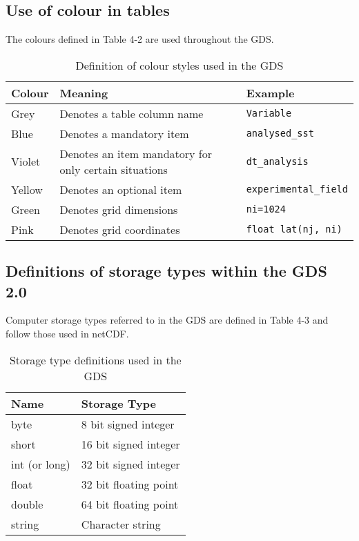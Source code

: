 \subsection{Use of colour in tables}
The colours defined in Table 4-2 are used throughout the GDS.
\begin{table}[h]
    \centering
    \caption{Definition of colour styles used in the GDS}
    \label{tab:color-styles}
    \begin{tabular}{|l|l|l|}
        \hline
        \rowcolor{lightgray} \textbf{Colour} & \textbf{Meaning} & \textbf{Example}\\
        \hline
        Grey & Denotes a table column name & \cellcolor{lightgray} \texttt{Variable}\\
        \hline
        Blue & Denotes a mandatory item & \cellcolor{cyan} \texttt{analysed\_sst}\\
        \hline
        Violet & Denotes an item mandatory for only certain situations & \cellcolor{Thistle} \texttt{dt\_analysis}\\
        \hline
        Yellow & Denotes an optional item & \cellcolor{Goldenrod} \texttt{experimental\_field}\\
        \hline
        Green & Denotes grid dimensions & \cellcolor{YellowGreen} \texttt{ni=1024}\\
        \hline
        Pink & Denotes grid coordinates & \cellcolor{Apricot} \texttt{float lat(nj, ni)}\\
        \hline
    \end{tabular}
\end{table}

\subsection{Definitions of storage types within the GDS 2.0}
Computer storage types referred to in the GDS are defined in Table 4-3 and follow those used in
netCDF.

\begin{table}[h]
    \centering
    \caption{Storage type definitions used in the GDS}
    \label{tab:storage-definitions}
    \begin{tabular}{|l|l|}
        \hline
        \rowcolor{lightgray} \textbf{Name} & \textbf{Storage Type}\\
        \hline
        byte & 8 bit signed integer\\
        \hline
        short & 16 bit signed integer\\
        \hline
        int (or long) & 32 bit signed integer\\
        \hline
        float & 32 bit floating point\\
        \hline
        double & 64 bit floating point\\
        \hline
        string & Character string\\
        \hline
    \end{tabular}
\end{table}
